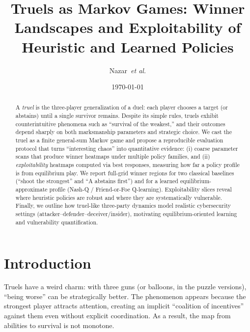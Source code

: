 \documentclass[11pt]{article}
\title{Truels as Markov Games: Winner Landscapes and Exploitability of Heuristic and Learned Policies}
\author{Nazar~\textit{et al.}}
\date{\today}
\begin{document}
\maketitle

\begin{abstract}
A \emph{truel} is the three-player generalization of a duel: each player chooses a target (or abstains) until a single survivor remains.
Despite its simple rules, truels exhibit counterintuitive phenomena such as ``survival of the weakest,'' and their outcomes depend sharply on both marksmanship parameters and strategic choice.
We cast the truel as a finite general-sum Markov game and propose a reproducible evaluation protocol that turns ``interesting chaos'' into quantitative evidence:
(i) coarse parameter scans that produce winner heatmaps under multiple policy families, and
(ii) \emph{exploitability} heatmaps computed via best responses, measuring how far a policy profile is from equilibrium play.
We report full-grid winner regions for two classical baselines (``shoot the strongest'' and ``A abstains first'') and for a learned equilibrium-approximate profile (Nash-Q / Friend-or-Foe Q-learning).
Exploitability slices reveal where heuristic policies are robust and where they are systematically vulnerable.
Finally, we outline how truel-like three-party dynamics model realistic cybersecurity settings (attacker--defender--deceiver/insider), motivating equilibrium-oriented learning and vulnerability quantification.
\end{abstract}

\section{Introduction}

Truels have a weird charm: with three guns (or balloons, in the puzzle versions), ``being worse'' can be strategically better.
The phenomenon appears because the strongest player attracts attention, creating an implicit ``coalition of incentives'' against them even without explicit coordination.
As a result, the map from abilities to survival is not monotone.
\end{document}
